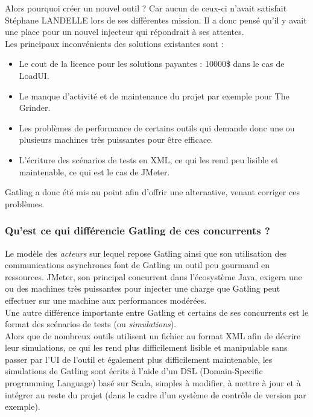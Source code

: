 Alors pourquoi créer un nouvel outil ? Car aucun de ceux-ci n'avait satisfait Stéphane LANDELLE lors de ses différentes mission. Il a donc pensé qu'il y avait une place pour un nouvel injecteur qui répondrait à ses attentes.\\

Les principaux inconvénients des solutions existantes sont :

\begin{itemize}
	\item Le cout de la licence pour les solutions payantes : 10000\$ dans le cas de LoadUI.
	\item Le manque d'activité et de maintenance du projet par exemple pour The Grinder. 
	\item Les problèmes de performance de certains outils qui demande donc une ou plusieurs machines très puissantes pour être efficace. 
	\item L'écriture des scénarios de tests en XML, ce qui les rend peu lisible et maintenable, ce qui est le cas de JMeter.\\
\end{itemize}

Gatling a donc été mis au point afin d'offrir une alternative, venant corriger ces problèmes.

\subsubsection*{Qu'est ce qui différencie Gatling de ces concurrents ?}

Le modèle des \textit{acteurs} sur lequel repose Gatling ainsi que son utilisation des communications asynchrones font de Gatling un outil peu gourmand en ressources.
JMeter, son principal concurrent dans l'écosystème Java, exigera une ou des machines très puissantes pour injecter une charge que Gatling peut effectuer sur une machine aux performances modérées.\\

Une autre différence importante entre Gatling et certains de ses concurrents est le format des scénarios de tests (ou \textit{simulations}).\\
Alors que de nombreux outils utilisent un fichier au format XML afin de décrire leur simulations, ce qui les rend plus difficilement lisible et manipulable sans passer par l'UI de l'outil et également plus difficilement maintenable, les simulations de Gatling sont écrits  à l'aide d'un DSL (Domain-Specific programming Language) basé sur Scala, simples à modifier, à mettre à jour et à intégrer au reste du projet (dans le cadre d'un système de contrôle de version par exemple).

